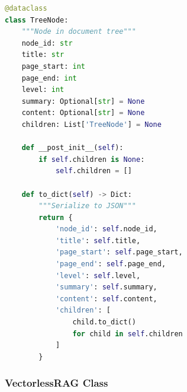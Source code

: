 \begin{lstlisting}[language=Python, caption=TreeNode Implementation]
@dataclass
class TreeNode:
    """Node in document tree"""
    node_id: str
    title: str
    page_start: int
    page_end: int
    level: int
    summary: Optional[str] = None
    content: Optional[str] = None
    children: List['TreeNode'] = None
    
    def __post_init__(self):
        if self.children is None:
            self.children = []
    
    def to_dict(self) -> Dict:
        """Serialize to JSON"""
        return {
            'node_id': self.node_id,
            'title': self.title,
            'page_start': self.page_start,
            'page_end': self.page_end,
            'level': self.level,
            'summary': self.summary,
            'content': self.content,
            'children': [
                child.to_dict()
                for child in self.children
            ]
        }
\end{lstlisting}

\subsubsection{VectorlessRAG Class}


